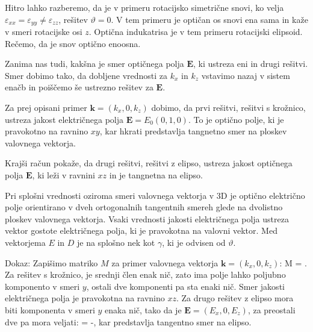 Hitro lahko razberemo, da je v primeru rotacijsko simetrične snovi, ko velja 
$\varepsilon_{xx} = \varepsilon_{yy}\neq \varepsilon_{zz}$, rešitev $\vartheta =0$.
V tem primeru je optičan os snovi ena sama in kaže v smeri rotacijske osi $z$. Optična
indukatrisa je v tem primeru rotacijski elipsoid. Rečemo, da je snov optično enoosna. 

Zanima nas tudi, kakšna je smer optičnega polja $\mathbf{E}$, ki ustreza eni in drugi rešitvi. 
Smer dobimo tako, da dobljene vrednosti za $k_x$ in $k_z$ vstavimo nazaj v sistem enačb
in poiščemo še ustrezno rešitev za $\mathbf{E}$.

Za prej opisani primer $\mathbf{k}=(k_x, 0, k_z)$ dobimo, da prvi rešitvi, rešitvi s krožnico, 
ustreza jakost električnega polja $\mathbf{E} = E_0 (0,1,0)$. To je optično polje, ki je 
pravokotno na ravnino $xy$, kar hkrati predstavlja tangnetno smer na ploskev valovnega vektorja.

Krajši račun pokaže, da drugi rešitvi, rešitvi z elipso, ustreza jakost optičnega polja $\mathbf{E}$,
ki leži v ravnini $xz$ in je tangnetna na elipso. 

Pri splošni vrednosti oziroma smeri valovnega vektorja v 3D je optično električno polje orientirano
v dveh ortogonalnih tangentnih smereh glede na dvolistno ploskev valovnega vektorja. Vsaki
vrednosti jakosti električnega polja ustreza vektor gostote električnega polja, ki je pravokotna
na valovni vektor. Med vektorjema $E$ in $D$ je na splošno nek kot $\gamma$, ki je odvisen od $\vartheta$.

Dokaz: Zapišimo matriko $M$ za primer valovnega vektorja $\mathbf{k}=(k_x, 0, k_z)$:
\beq
M\cdot {} =  \cdot 
\left[\begin{array}{c}
E_x \\
E_y \\
E_z
\end{array}\right]\!\!.
\eeq
Za rešitev s krožnico, je srednji člen enak nič, zato ima polje lahko poljubno komponento v smeri $y$, 
ostali dve komponenti pa sta enaki nič. Smer jakosti električnega polja je pravokotna na ravnino $xz$.
Za drugo rešitev z elipso mora biti komponenta v smeri $y$ enaka nič, tako da je 
$\mathbf{E} = (E_x, 0, E_z)$, za preostali dve pa mora veljati:
\beq
{} = -,
\eeq
kar predstavlja tangentno smer na elipso. 

